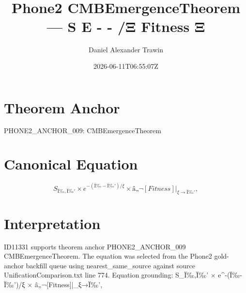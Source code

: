 \documentclass[11pt]{article}
\title{Phone2 CMBEmergenceTheorem — S E - - /Ξ Fitness Ξ}
\author{Daniel Alexander Trawin}
\date{2026-06-11T06:55:07Z}
\begin{document}
\maketitle
\section*{Theorem Anchor}
PHONE2_ANCHOR_009: CMBEmergenceTheorem
\section*{Canonical Equation}
\[
S_{Ï‰,Ï‰'} × e^{-(Ï‰-Ï‰')/ξ} × â„¬[Fitness]|_{ξ→Ï‰'},
\]
\section*{Interpretation}
ID11331 supports theorem anchor PHONE2_ANCHOR_009 CMBEmergenceTheorem. The equation was selected from the Phone2 gold-anchor backfill queue using nearest_same_source against source UnificationComparison.txt line 774. Equation grounding: S_{Ï‰,Ï‰'} × e^{-(Ï‰-Ï‰')/ξ} × â„¬[Fitness]|_{ξ→Ï‰'},
\end{document}
